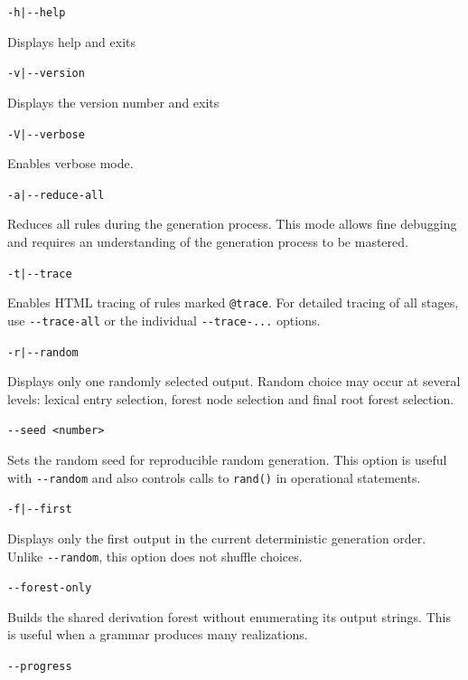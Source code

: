 \documentclass[11pt]{article}
\begin{document}
\begin{description}
	\item \verb#-h|--help#

	      Displays help and exits

	\item \verb#-v|--version#

	      Displays the version number and exits

	\item \verb#-V|--verbose#

	      Enables verbose mode.

	\item \verb#-a|--reduce-all#

	      Reduces all rules during the generation process. This mode
	      allows fine debugging and requires an understanding of the
	      generation process to be mastered.

	\item \verb#-t|--trace#

	      Enables HTML tracing of rules marked \verb#@trace#. For detailed
	      tracing of all stages, use \verb#--trace-all# or the individual
	      \verb#--trace-...# options.

	\item \verb#-r|--random#

	      Displays only one randomly selected output. Random choice may occur at
	      several levels: lexical entry selection, forest node selection and final
	      root forest selection.

	\item \verb#--seed <number>#

	      Sets the random seed for reproducible random generation. This option is
	      useful with \verb#--random# and also controls calls to \verb#rand()# in
	      operational statements.

	\item \verb#-f|--first#

	      Displays only the first output in the current deterministic generation
	      order. Unlike \verb#--random#, this option does not shuffle choices.

	\item \verb#--forest-only#

	      Builds the shared derivation forest without enumerating its output strings.
	      This is useful when a grammar produces many realizations.

	\item \verb#--progress#


\end{description}
\end{document}
